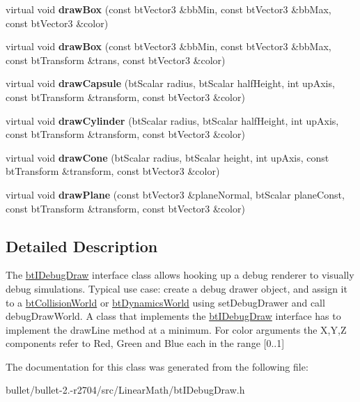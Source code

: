 \begin{DoxyCompactItemize}
\item 
\hypertarget{classbt_i_debug_draw_a9c9e46fa03d6296f8b3f57538db6be7f}{virtual void {\bfseries draw\+Box} (const bt\+Vector3 \&bb\+Min, const bt\+Vector3 \&bb\+Max, const bt\+Vector3 \&color)}\label{classbt_i_debug_draw_a9c9e46fa03d6296f8b3f57538db6be7f}

\item 
\hypertarget{classbt_i_debug_draw_a1895c36d90017439329ad2b375c92285}{virtual void {\bfseries draw\+Box} (const bt\+Vector3 \&bb\+Min, const bt\+Vector3 \&bb\+Max, const bt\+Transform \&trans, const bt\+Vector3 \&color)}\label{classbt_i_debug_draw_a1895c36d90017439329ad2b375c92285}

\item 
\hypertarget{classbt_i_debug_draw_aec2ac4fe5ee1073a2eeb7f459a22dd87}{virtual void {\bfseries draw\+Capsule} (bt\+Scalar radius, bt\+Scalar half\+Height, int up\+Axis, const bt\+Transform \&transform, const bt\+Vector3 \&color)}\label{classbt_i_debug_draw_aec2ac4fe5ee1073a2eeb7f459a22dd87}

\item 
\hypertarget{classbt_i_debug_draw_aa0f2076c26f158ba5579a07a931fabd6}{virtual void {\bfseries draw\+Cylinder} (bt\+Scalar radius, bt\+Scalar half\+Height, int up\+Axis, const bt\+Transform \&transform, const bt\+Vector3 \&color)}\label{classbt_i_debug_draw_aa0f2076c26f158ba5579a07a931fabd6}

\item 
\hypertarget{classbt_i_debug_draw_a0059af5b0a43dd6b2d464f94938d4d14}{virtual void {\bfseries draw\+Cone} (bt\+Scalar radius, bt\+Scalar height, int up\+Axis, const bt\+Transform \&transform, const bt\+Vector3 \&color)}\label{classbt_i_debug_draw_a0059af5b0a43dd6b2d464f94938d4d14}

\item 
\hypertarget{classbt_i_debug_draw_a012926f8d101863d8d9d1af6f2fca0a0}{virtual void {\bfseries draw\+Plane} (const bt\+Vector3 \&plane\+Normal, bt\+Scalar plane\+Const, const bt\+Transform \&transform, const bt\+Vector3 \&color)}\label{classbt_i_debug_draw_a012926f8d101863d8d9d1af6f2fca0a0}

\end{DoxyCompactItemize}


\subsection{Detailed Description}
The \hyperlink{classbt_i_debug_draw}{bt\+I\+Debug\+Draw} interface class allows hooking up a debug renderer to visually debug simulations. Typical use case\+: create a debug drawer object, and assign it to a \hyperlink{classbt_collision_world}{bt\+Collision\+World} or \hyperlink{classbt_dynamics_world}{bt\+Dynamics\+World} using set\+Debug\+Drawer and call debug\+Draw\+World. A class that implements the \hyperlink{classbt_i_debug_draw}{bt\+I\+Debug\+Draw} interface has to implement the draw\+Line method at a minimum. For color arguments the X,Y,Z components refer to Red, Green and Blue each in the range \mbox{[}0..1\mbox{]} 

The documentation for this class was generated from the following file\+:\begin{DoxyCompactItemize}
\item 
bullet/bullet-\/2.-\/r2704/src/\+Linear\+Math/bt\+I\+Debug\+Draw.\+h\end{DoxyCompactItemize}
